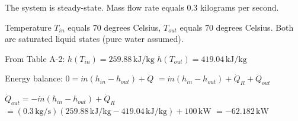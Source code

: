 The system is steady-state.  
Mass flow rate equals 0.3 kilograms per second.  

Temperature \( T_{in} \) equals 70 degrees Celsius, \( T_{out} \) equals 70 degrees Celsius. Both are saturated liquid states (pure water assumed).  

From Table A-2:  
\( h(T_{in}) = 259.88 \, \text{kJ/kg} \)  
\( h(T_{out}) = 419.04 \, \text{kJ/kg} \)  

Energy balance:  
\( 0 = \dot{m}(h_{in} - h_{out}) + \dot{Q} \)  
\( = \dot{m}(h_{in} - h_{out}) + \dot{Q}_R + \dot{Q}_{out} \)  

\( \dot{Q}_{out} = -\dot{m}(h_{in} - h_{out}) + \dot{Q}_R \)  
\( = (0.3 \, \text{kg/s})(259.88 \, \text{kJ/kg} - 419.04 \, \text{kJ/kg}) + 100 \, \text{kW} \)  
\( = -62.182 \, \text{kW} \)